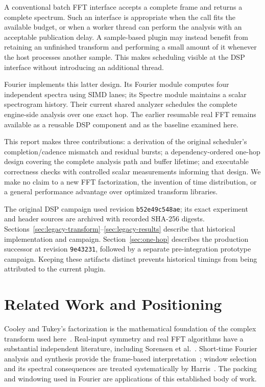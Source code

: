 \documentclass[11pt,letterpaper]{article}
\newcommand{\code}[1]{\texttt{#1}}
\begin{document}
A conventional batch FFT interface accepts a complete frame and returns a
complete spectrum. Such an interface is appropriate when the call fits the
available budget, or when a worker thread can perform the analysis with an
acceptable publication delay. A sample-based plugin may instead benefit from
retaining an unfinished transform and performing a small amount of it whenever
the host processes another sample. This makes scheduling visible at the DSP
interface without introducing an additional thread.

Fourier implements this latter design. Its Fourier module computes four
independent spectra using SIMD lanes; its Spectre module maintains a scalar
spectrogram history. Their current shared analyzer schedules the complete
engine-side analysis over one exact hop. The earlier resumable real FFT remains
available as a reusable DSP component and as the baseline examined here.

This report makes three contributions: a derivation of the original scheduler's
completion/cadence mismatch and residual bursts; a dependency-ordered one-hop
design covering the complete analysis path and buffer lifetime; and executable
correctness checks with controlled scalar measurements informing that design.
We make no claim to a new FFT factorization, the invention of time distribution,
or a general performance advantage over optimized transform libraries.

The original DSP campaign used revision \code{b52e49c548ae}; its exact
experiment and header sources are archived with recorded SHA-256 digests.
Sections~\ref{sec:legacy-transform}--\ref{sec:legacy-results} describe that
historical implementation and campaign. Section~\ref{sec:one-hop} describes the
production successor at revision \code{9e43231}, followed by a separate
pre-integration prototype campaign. Keeping these artifacts distinct prevents
historical timings from being attributed to the current plugin.

\section{Related Work and Positioning}
\label{sec:related}
Cooley and Tukey's factorization is the mathematical foundation of the complex
transform used here~\cite{cooley1965}. Real-input symmetry and real FFT
algorithms have a substantial independent literature, including Sorensen
et al.~\cite{sorensen1987}. Short-time Fourier analysis and synthesis provide
the frame-based interpretation~\cite{allen1977}; window selection and its
spectral consequences are treated systematically by Harris~\cite{harris1978}.
The packing and windowing used in Fourier are applications of this established
body of work.
\end{document}
